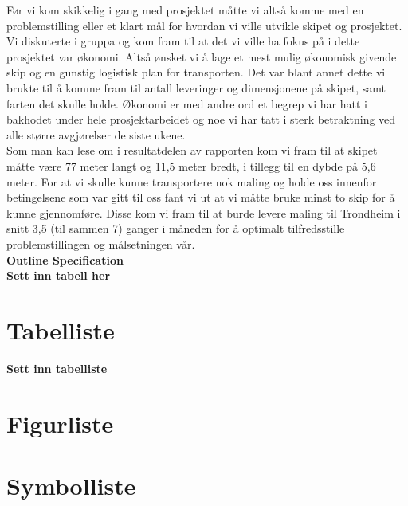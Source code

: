 \documentclass[norsk]{article}
\begin{document}
Før vi kom skikkelig i gang med prosjektet måtte vi altså komme med en problemstilling eller et klart mål for hvordan vi ville utvikle skipet og prosjektet. Vi diskuterte i gruppa og kom fram til at det vi ville ha fokus på i dette prosjektet var økonomi. Altså ønsket vi å lage et mest mulig økonomisk givende skip og en gunstig logistisk plan for transporten. Det var blant annet dette vi brukte til å komme fram til antall leveringer og dimensjonene på skipet, samt farten det skulle holde. Økonomi er med andre ord et begrep vi har hatt i bakhodet under hele prosjektarbeidet og noe vi har tatt i sterk betraktning ved alle større avgjørelser de siste ukene.\\

Som man kan lese om i resultatdelen av rapporten kom vi fram til at skipet måtte være 77 meter langt og 11,5 meter bredt, i tillegg til en dybde på 5,6 meter.  For at vi skulle kunne transportere nok maling og holde oss innenfor betingelsene som var gitt til oss fant vi ut at vi måtte bruke minst to skip for å kunne gjennomføre. Disse kom vi fram til at burde levere maling til Trondheim i snitt 3,5 (til sammen 7)  ganger i måneden for å optimalt tilfredsstille problemstillingen og målsetningen vår. \\


{\Large \textbf{Outline Specification} }\\

\textbf{Sett inn tabell her} \\

\tableofcontents 
\section{Tabelliste} 
\textbf{Sett inn tabelliste} 

\section{Figurliste} 
\listoffigures
\newpage

\section{Symbolliste} 
\end{document}
